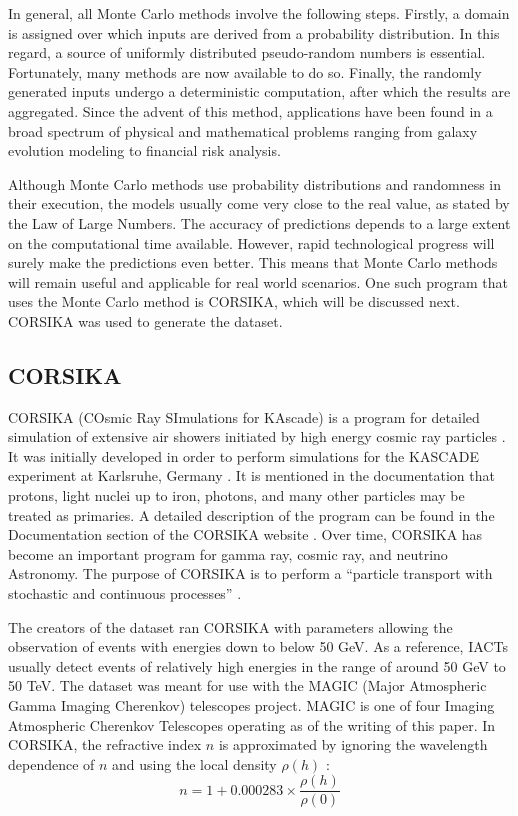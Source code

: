 \documentclass[a4paper, 12pt]{report}
\theoremstyle{definition}
\begin{document}
In general, all Monte Carlo methods involve the following steps. Firstly, a domain is assigned over which inputs are derived from a probability distribution. In this regard, a source of uniformly distributed pseudo-random numbers is essential. Fortunately, many methods are now available to do so. Finally, the randomly generated inputs undergo a deterministic computation, after which the results are aggregated. Since the advent of this method, applications have been found in a broad spectrum of physical and mathematical problems ranging from galaxy evolution modeling to financial risk analysis.

Although Monte Carlo methods use probability distributions and randomness in their execution, the models usually come very close to the real value, as stated by the Law of Large Numbers. The accuracy of predictions depends to a large extent on the computational time available. However, rapid technological progress will surely make the predictions even better. This means that Monte Carlo methods will remain useful and applicable for real world scenarios. One such program that uses the Monte Carlo method is CORSIKA, which will be discussed next. CORSIKA was used to generate the dataset.

\subsection{CORSIKA}

CORSIKA (COsmic Ray SImulations for KAscade) is a program for detailed simulation of extensive air showers initiated by high energy cosmic ray particles \autocite{heck_pierog_2018}. It was initially developed in order to perform simulations for the KASCADE experiment at Karlsruhe, Germany \autocite{kascade}. It is mentioned in the documentation that protons, light nuclei up to iron, photons, and many other particles may be treated as primaries. A detailed description of the program can be found in the Documentation section of the CORSIKA website \autocite{corsika_phys}. Over time, CORSIKA has become an important program for gamma ray, cosmic ray, and neutrino Astronomy. The purpose of CORSIKA is to perform a “particle transport with stochastic and continuous processes” \autocite{nextgencorsika}.

The creators of the dataset ran CORSIKA with parameters allowing the observation of events with energies down to below 50 GeV. As a reference, IACTs usually detect events of relatively high energies in the range of around 50 GeV to 50 TeV. The dataset was meant for use with the MAGIC (Major Atmospheric Gamma Imaging Cherenkov) telescopes project. MAGIC is one of four Imaging Atmospheric Cherenkov Telescopes operating as of the writing of this paper. In CORSIKA, the refractive index $n$ is approximated by ignoring the wavelength dependence of $n$ and using the local density $\rho(h)$ \autocite{weast_1986}:
\begin{equation}
    n = 1 + 0.000283 \times \frac{\rho(h)}{\rho(0)}
\end{equation}
\end{document}
